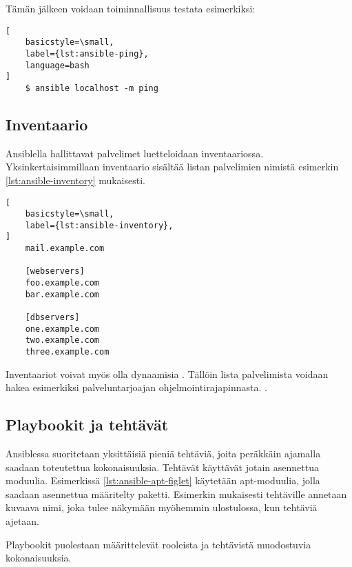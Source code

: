 Tämän jälkeen voidaan toiminnallisuus testata esimerkiksi:

\begin{lstlisting}[
    basicstyle=\small,
    label={lst:ansible-ping},
    language=bash
]
    $ ansible localhost -m ping
\end{lstlisting}

\subsection{Inventaario}

Ansiblella hallittavat palvelimet luetteloidaan inventaariossa.
Yksinkertaisimmillaan inventaario sisältää listan palvelimien nimistä
esimerkin \ref{lst:ansible-inventory} mukaisesti.
\parencite{JamesFreeman2020PA2}

\begin{lstlisting}[
    basicstyle=\small,
    label={lst:ansible-inventory},
]
    mail.example.com

    [webservers]
    foo.example.com
    bar.example.com

    [dbservers]
    one.example.com
    two.example.com
    three.example.com
\end{lstlisting}

Inventaariot voivat myös olla dynaamisia \parencite{JamesFreeman2020PA2}.
Tällöin lista palvelimista voidaan hakea esimerkiksi palveluntarjoajan
ohjelmointirajapinnasta. \parencite{AnsibleDocs}.

\subsection{Playbookit ja tehtävät}

Ansiblessa suoritetaan yksittäisiä pieniä tehtäviä, joita peräkkäin ajamalla
saadaan toteutettua kokonaisuuksia. Tehtävät käyttävät jotain asennettua
moduulia. \parencite{JamesFreeman2020PA2} Esimerkissä \ref{lst:ansible-apt-figlet}
käytetään apt-moduulia, jolla saadaan asennettua määritelty paketti. Esimerkin
mukaisesti tehtäville annetaan kuvaava nimi, joka tulee näkymään myöhemmin
ulostulossa, kun tehtäviä ajetaan.



Playbookit puolestaan määrittelevät rooleista ja tehtävistä muodostuvia
kokonaisuuksia. \parencite{JamesFreeman2020PA2}

